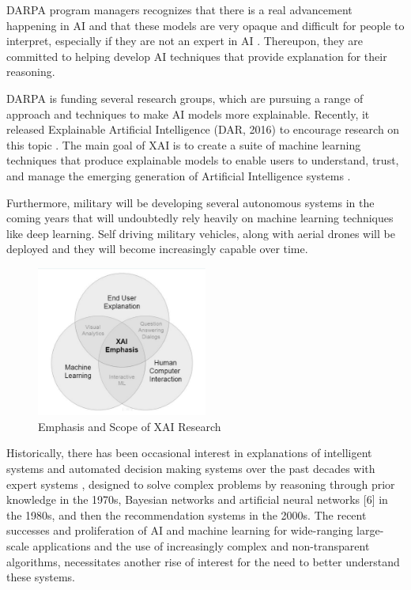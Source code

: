 DARPA program managers recognizes that there is a real advancement happening in AI and that these models are very opaque and difficult for people to interpret, especially if they are not an expert in AI \cite{Knight2017}. Thereupon, they are committed to helping develop AI techniques that provide explanation for their reasoning.

DARPA is funding several research groups, which are pursuing a range of approach and techniques to make AI models more explainable. Recently, it released Explainable Artificial Intelligence (DAR, 2016) to encourage research on this topic \cite{Gunning}. The main goal of XAI is to create a suite of machine learning techniques that produce explainable models to enable users to understand, trust, and manage the emerging generation of Artificial Intelligence systems \cite{Gunning2}.

Furthermore, military will be developing several autonomous systems in the coming years that will undoubtedly rely heavily on machine learning techniques like deep learning. Self driving military vehicles, along with aerial drones will be deployed and they will become increasingly capable over time.

\begin{figure}[htbp]
\centering
\includegraphics[width=0.5\textwidth]{images/XAI-research-1-crop.png}
\caption{Emphasis and Scope of XAI Research}
\label{fig:xai-1}
\end{figure}

Historically, there has been occasional interest in explanations of intelligent systems and automated decision making systems over the past decades with expert systems \cite{Abdul}, designed to solve complex problems by reasoning through prior knowledge in the 1970s, Bayesian networks and artificial neural networks [6] in the 1980s, and then the recommendation systems in the 2000s. The recent successes and proliferation of AI and machine learning for wide-ranging large-scale applications and the use of increasingly complex and non-transparent algorithms, necessitates another rise of interest for the need to better understand these systems.


